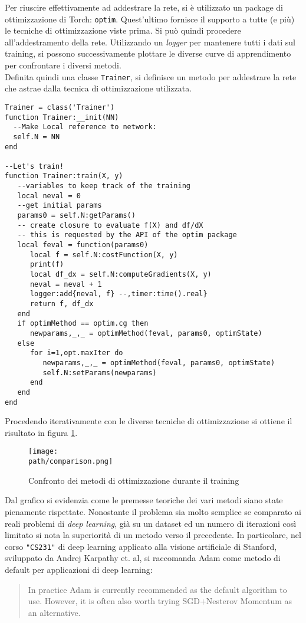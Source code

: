 Per riuscire effettivamente ad addestrare la rete, si è utilizzato un package di ottimizzazione di Torch: \texttt{optim}. Quest'ultimo fornisce il supporto a tutte (e più) le tecniche di ottimizzazione viste prima. 
Si può quindi procedere all'addestramento della rete. Utilizzando un \emph{logger} per mantenere tutti i dati sul training, si possono successivamente plottare le diverse curve di apprendimento per confrontare i diversi metodi. \\
Definita quindi una classe \texttt{Trainer}, si definisce un metodo per addestrare la rete che astrae dalla tecnica di ottimizzazione utilizzata. 
\begin{lstlisting}[language={[5.2]Lua}]
Trainer = class('Trainer')
function Trainer:__init(NN)
  --Make Local reference to network:
  self.N = NN
end

--Let's train!
function Trainer:train(X, y)
   --variables to keep track of the training
   local neval = 0
   --get initial params
   params0 = self.N:getParams()
   -- create closure to evaluate f(X) and df/dX
   -- this is requested by the API of the optim package
   local feval = function(params0)
      local f = self.N:costFunction(X, y)
      print(f)
      local df_dx = self.N:computeGradients(X, y)
      neval = neval + 1
      logger:add{neval, f} --,timer:time().real}
      return f, df_dx
   end
   if optimMethod == optim.cg then
      newparams,_,_ = optimMethod(feval, params0, optimState)
   else
      for i=1,opt.maxIter do
         newparams,_,_ = optimMethod(feval, params0, optimState)
         self.N:setParams(newparams)
      end
   end
end
\end{lstlisting}

Procedendo iterativamente con le diverse tecniche di ottimizzazione si ottiene il risultato in figura \ref{fig:comparison}. 

\begin{figure}[h!]
 \centering
 \texttt{[image: \\path/comparison.png]}
 \caption{Confronto dei metodi di ottimizzazione durante il training}
 \label{fig:comparison}
\end{figure}
Dal grafico si evidenzia come le premesse teoriche dei vari metodi siano state pienamente rispettate. Nonostante il problema sia molto semplice se comparato ai reali problemi di \emph{deep learning}, già su un dataset ed un numero di iterazioni così limitato si nota la superiorità di un metodo verso il precedente. In particolare, nel corso \texttt{"CS231"} di deep learning applicato alla visione artificiale di Stanford\parencite{WCS231-adam}, sviluppato da Andrej Karpathy et. al, si raccomanda Adam come metodo di default per applicazioni di deep learning: 
\begin{quote}
In practice Adam is currently recommended as the default algorithm to use. However, it is often also worth trying SGD+Nesterov Momentum as an alternative.
\end{quote}
